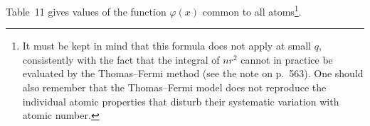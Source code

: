 Table~11 gives values of the function $\varphi(x)$ common to all atoms\footnote{It must be kept in mind that this formula does not apply at small $q$, consistently with the fact that the integral of $nr^2$ cannot in practice be evaluated by the Thomas--Fermi method (see the note on p.~563). One should also remember that the Thomas--Fermi model does not reproduce the individual atomic properties that disturb their systematic variation with atomic number.}.

